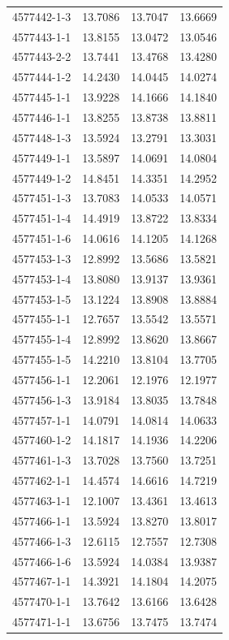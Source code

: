 \begin{longtable}{lrrr}
4577442-1-3 & 13.7086 & 13.7047 & 13.6669 \\
4577443-1-1 & 13.8155 & 13.0472 & 13.0546 \\
4577443-2-2 & 13.7441 & 13.4768 & 13.4280 \\
4577444-1-2 & 14.2430 & 14.0445 & 14.0274 \\
4577445-1-1 & 13.9228 & 14.1666 & 14.1840 \\
4577446-1-1 & 13.8255 & 13.8738 & 13.8811 \\
4577448-1-3 & 13.5924 & 13.2791 & 13.3031 \\
4577449-1-1 & 13.5897 & 14.0691 & 14.0804 \\
4577449-1-2 & 14.8451 & 14.3351 & 14.2952 \\
4577451-1-3 & 13.7083 & 14.0533 & 14.0571 \\
4577451-1-4 & 14.4919 & 13.8722 & 13.8334 \\
4577451-1-6 & 14.0616 & 14.1205 & 14.1268 \\
4577453-1-3 & 12.8992 & 13.5686 & 13.5821 \\
4577453-1-4 & 13.8080 & 13.9137 & 13.9361 \\
4577453-1-5 & 13.1224 & 13.8908 & 13.8884 \\
4577455-1-1 & 12.7657 & 13.5542 & 13.5571 \\
4577455-1-4 & 12.8992 & 13.8620 & 13.8667 \\
4577455-1-5 & 14.2210 & 13.8104 & 13.7705 \\
4577456-1-1 & 12.2061 & 12.1976 & 12.1977 \\
4577456-1-3 & 13.9184 & 13.8035 & 13.7848 \\
4577457-1-1 & 14.0791 & 14.0814 & 14.0633 \\
4577460-1-2 & 14.1817 & 14.1936 & 14.2206 \\
4577461-1-3 & 13.7028 & 13.7560 & 13.7251 \\
4577462-1-1 & 14.4574 & 14.6616 & 14.7219 \\
4577463-1-1 & 12.1007 & 13.4361 & 13.4613 \\
4577466-1-1 & 13.5924 & 13.8270 & 13.8017 \\
4577466-1-3 & 12.6115 & 12.7557 & 12.7308 \\
4577466-1-6 & 13.5924 & 14.0384 & 13.9387 \\
4577467-1-1 & 14.3921 & 14.1804 & 14.2075 \\
4577470-1-1 & 13.7642 & 13.6166 & 13.6428 \\
4577471-1-1 & 13.6756 & 13.7475 & 13.7474 \\

\end{longtable}
